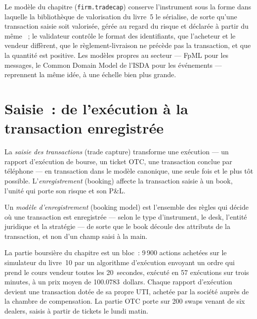 Le modèle du chapitre (\texttt{firm.tradecap}) conserve l'instrument sous la forme dans laquelle la bibliothèque de valorisation du livre~5 le sérialise, de sorte qu'une transaction saisie
soit valorisée, gérée au regard du risque et déclarée à partir du même ~; le validateur contrôle le format des identifiants, que l'acheteur et le vendeur diffèrent, que
le règlement-livraison ne précède pas la transaction, et que la quantité est positive. Les modèles propres au secteur --- FpML pour les messages, le Common Domain
Model de l'ISDA pour les événements --- reprennent la même idée, à une échelle bien plus grande.

\section{Saisie~: de l'exécution à la transaction enregistrée}

\begin{definition}\label{def:pl:trade-capture-and-booking:capture}
La \emph{saisie des transactions} (trade capture) transforme une exécution --- un rapport d'exécution de bourse, un ticket OTC, une transaction conclue par téléphone --- en transaction
dans le modèle canonique, une seule fois et le plus tôt possible. L'\emph{enregistrement} (booking) affecte la transaction saisie à un book, l'unité qui porte
son risque et son P\&L.
\end{definition}

\begin{definition}\label{def:pl:trade-capture-and-booking:model}
Un \emph{modèle d'enregistrement} (booking model) est l'ensemble des règles qui décide où une transaction est enregistrée --- selon le type d'instrument, le desk, l'entité
juridique et la stratégie --- de sorte que le book découle des attributs de la transaction, et non d'un champ saisi à la main.
\end{definition}

La partie boursière du chapitre est un bloc~: 9\,900 actions achetées sur le simulateur du livre~10 par un algorithme d'exécution envoyant un ordre qui prend le
cours vendeur toutes les 20~secondes, exécuté en 57 exécutions sur trois minutes, à un prix moyen de 100.0783~dollars. Chaque rapport d'exécution devient une transaction dotée de sa
propre UTI, achetée par la société auprès de la chambre de compensation. La partie OTC porte sur 200 swaps venant de six dealers, saisis à partir de tickets le lundi matin.

